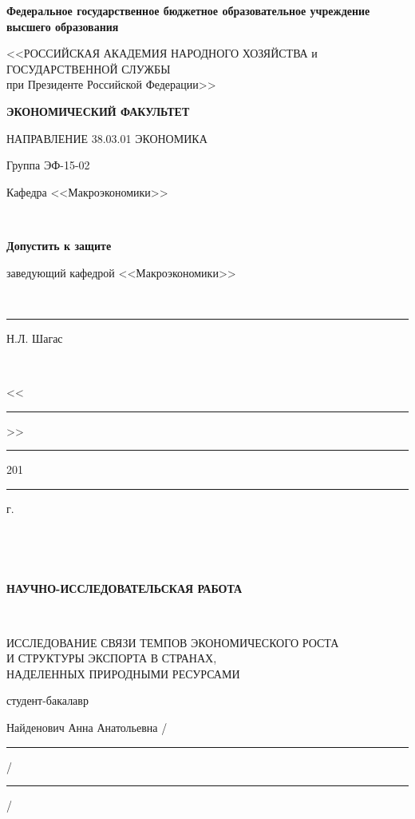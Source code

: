 \documentclass[12pt,a4paper, oneside]{extreport}
\begin{document}
\thispagestyle{empty} %


\begingroup
{}  
\begin{center}
	\small \bfseries Федеральное государственное бюджетное образовательное учреждение высшего образования
	
	<<РОССИЙСКАЯ АКАДЕМИЯ НАРОДНОГО ХОЗЯЙСТВА и\\ ГОСУДАРСТВЕННОЙ СЛУЖБЫ \\
	при Президенте Российской Федерации>>
	
	\vspace{2ex}
	
	\bfseries
	ЭКОНОМИЧЕСКИЙ ФАКУЛЬТЕТ
	
	НАПРАВЛЕНИЕ 38.03.01 ЭКОНОМИКА
\end{center}

\vfill


\noindent\small Группа ЭФ-15-02
\hfill
\parbox[t]{20em}{\centering\small
	Кафедра <<Макроэкономики>>
	
	\mbox{ }
	
	\textbf{Допустить к защите}
	
	заведующий кафедрой <<Макроэкономики>>
	
	\mbox{ }
	
	\rule{8em}{0.5pt} Н.Л. Шагас
	
	\mbox{ }
	
	<<\rule{2em}{0.5pt}>> \rule{5em}{0.5pt} 201\rule{1em}{0.5pt} г. }

\mbox{ }

\mbox{ }

\begin{center}\bfseries
	НАУЧНО-ИССЛЕДОВАТЕЛЬСКАЯ РАБОТА
	
	\mbox{ }
	
	\large
	ИССЛЕДОВАНИЕ СВЯЗИ ТЕМПОВ ЭКОНОМИЧЕСКОГО РОСТА\\
	И СТРУКТУРЫ ЭКСПОРТА В СТРАНАХ,\\
	НАДЕЛЕННЫХ ПРИРОДНЫМИ РЕСУРСАМИ
\end{center}

\vfill

\noindent\normalsize
студент-бакалавр

\noindent
Найденович Анна Анатольевна
\hfill /\rule{6em}{0.5pt}/\rule{6em}{0.5pt}/
\end{document}
